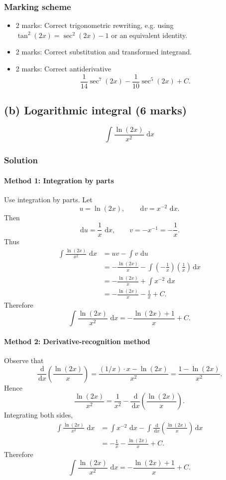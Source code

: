 \documentclass[12pt]{article}
\newcommand{\dd}{\,\mathrm{d}}
\begin{document}
\subsubsection{Marking scheme}
\begin{itemize}
\item 2 marks: Correct trigonometric rewriting, e.g. using \(\tan^2(2x)=\sec^2(2x)-1\) or an equivalent identity.
\item 2 marks: Correct substitution and transformed integrand.
\item 2 marks: Correct antiderivative
\[
\frac{1}{14}\sec^7(2x)-\frac{1}{10}\sec^5(2x)+C.
\]
\end{itemize}

\newpage
\subsection{(b) Logarithmic integral \hfill (6 marks)}

\[
\int \frac{\ln(2x)}{x^2}\,\dd x
\]
\bigskip
\subsubsection{Solution}

\paragraph{Method 1: Integration by parts}

Use integration by parts. Let
\[
u=\ln(2x),
\qquad
\dd v=x^{-2}\,\dd x.
\]
Then
\[
\dd u=\frac{1}{x}\,\dd x,
\qquad
v=-x^{-1}=-\frac{1}{x}.
\]
Thus
\begin{align*}
\int \frac{\ln(2x)}{x^2}\,\dd x
&=uv-\int v\,\dd u \\
&=-\frac{\ln(2x)}{x}-\int\left(-\frac{1}{x}\right)\left(\frac{1}{x}\right)\dd x \\
&=-\frac{\ln(2x)}{x}+\int x^{-2}\,\dd x \\
&=-\frac{\ln(2x)}{x}-\frac{1}{x}+C.
\end{align*}
Therefore
\[
\boxed{
\int \frac{\ln(2x)}{x^2}\,\dd x
=-\frac{\ln(2x)+1}{x}+C.
}
\]
\bigskip
\paragraph{Method 2: Derivative-recognition method}

Observe that
\[
\frac{\dd}{\dd x}\left(\frac{\ln(2x)}{x}\right)
=\frac{(1/x)\cdot x-\ln(2x)}{x^2}
=\frac{1-\ln(2x)}{x^2}.
\]
Hence
\[
\frac{\ln(2x)}{x^2}
=\frac{1}{x^2}-\frac{\dd}{\dd x}\left(\frac{\ln(2x)}{x}\right).
\]
Integrating both sides,
\begin{align*}
\int \frac{\ln(2x)}{x^2}\,\dd x
&=\int x^{-2}\,\dd x-\int \frac{\dd}{\dd x}\left(\frac{\ln(2x)}{x}\right)\dd x \\
&=-\frac{1}{x}-\frac{\ln(2x)}{x}+C.
\end{align*}
Therefore
\[
\boxed{
\int \frac{\ln(2x)}{x^2}\,\dd x
=-\frac{\ln(2x)+1}{x}+C.
}
\]
\end{document}
